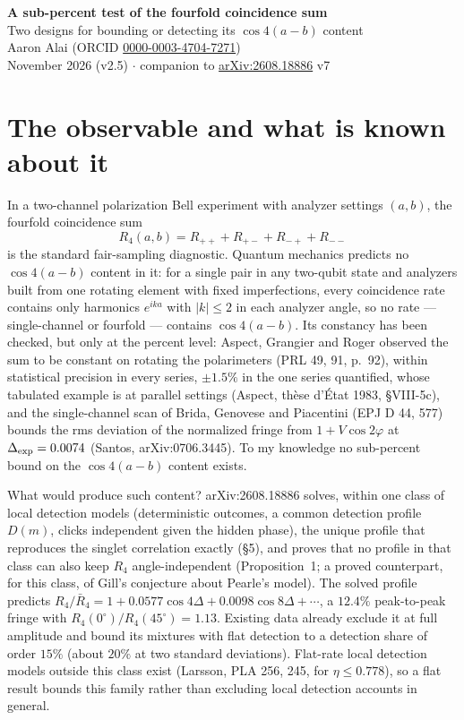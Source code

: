\documentclass[10pt]{article}
\begin{document}
\begin{center}
{\Large\bfseries A sub-percent test of the fourfold coincidence sum}\\[3pt]
{\large Two designs for bounding or detecting its $\cos 4(a-b)$ content}\\[5pt]
Aaron Alai (ORCID \href{https://orcid.org/0000-0003-4704-7271}{0000-0003-4704-7271})\\
November 2026 (v2.5) $\cdot$ companion to \href{https://arxiv.org/abs/2608.18886}{arXiv:2608.18886} v7
\end{center}

\section*{The observable and what is known about it}
In a two-channel polarization Bell experiment with analyzer settings $(a,b)$, the fourfold coincidence sum
\[
R_4(a,b) = R_{++}+R_{+-}+R_{-+}+R_{--}
\]
is the standard fair-sampling diagnostic. Quantum mechanics predicts no $\cos 4(a-b)$ content in it: for a single pair in any two-qubit state and analyzers built from one rotating element with fixed imperfections, every coincidence rate contains only harmonics $e^{ika}$ with $|k|\le 2$ in each analyzer angle, so no rate --- single-channel or fourfold --- contains $\cos 4(a-b)$. Its constancy has been checked, but only at the percent level: Aspect, Grangier and Roger observed the sum to be constant on rotating the polarimeters (PRL 49, 91, p.~92), within statistical precision in every series, $\pm 1.5\%$ in the one series quantified, whose tabulated example is at parallel settings (Aspect, th\`ese d'\'Etat 1983, \S VIII-5c), and the single-channel scan of Brida, Genovese and Piacentini (EPJ D 44, 577) bounds the rms deviation of the normalized fringe from $1+V\cos 2\varphi$ at $\Delta_{\rm exp}=0.0074$ (Santos, arXiv:0706.3445). To my knowledge no sub-percent bound on the $\cos 4(a-b)$ content exists.

What would produce such content? arXiv:2608.18886 solves, within one class of local detection models (deterministic outcomes, a common detection profile $D(m)$, clicks independent given the hidden phase), the unique profile that reproduces the singlet correlation exactly (\S5), and proves that no profile in that class can also keep $R_4$ angle-independent (Proposition~1; a proved counterpart, for this class, of Gill's conjecture about Pearle's model). The solved profile predicts $R_4/\bar R_4 = 1 + 0.0577\cos 4\Delta + 0.0098\cos 8\Delta + \cdots$, a $12.4\%$ peak-to-peak fringe with $R_4(0^\circ)/R_4(45^\circ)=1.13$. Existing data already exclude it at full amplitude and bound its mixtures with flat detection to a detection share of order $15\%$ (about $20\%$ at two standard deviations). Flat-rate local detection models outside this class exist (Larsson, PLA 256, 245, for $\eta\le 0.778$), so a flat result bounds this family rather than excluding local detection accounts in general.
\end{document}
